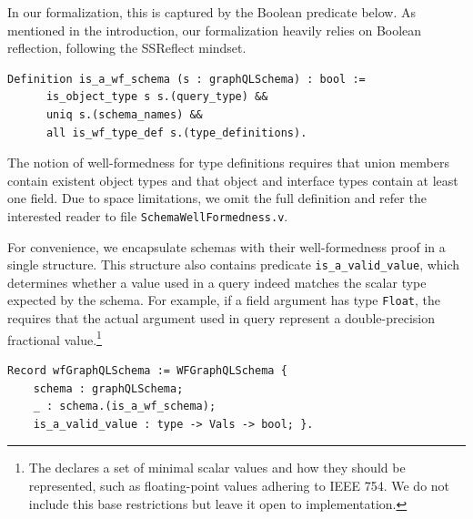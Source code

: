 In our \coq formalization, this is captured by the Boolean predicate below. As mentioned in the introduction, our formalization heavily relies on Boolean reflection, following the SSReflect mindset.
%
\begin{verbatim}
Definition is_a_wf_schema (s : graphQLSchema) : bool :=
      is_object_type s s.(query_type) &&
      uniq s.(schema_names) &&
      all is_wf_type_def s.(type_definitions).
\end{verbatim}
%
The notion of well-formedness for type definitions requires \eg that union members contain existent object types and that object and interface types contain at least one field. Due to space limitations, we omit the full definition and refer the interested reader to file \texttt{SchemaWellFormedness.v}.




For convenience, we encapsulate schemas with their well-formedness proof in a single structure. This structure also contains predicate \texttt{is_a_valid_value}, which determines whether a value used in a query indeed matches the scalar type expected by the schema. For example, if a field argument has type \texttt{Float}, the \spec requires that the actual argument used in query represent a double-precision fractional value.\footnote{The \spec declares a set of minimal scalar values and how they should be represented, such as floating-point values adhering to IEEE 754. We do not include this base restrictions but leave it open to implementation.}
%
\begin{verbatim}
Record wfGraphQLSchema := WFGraphQLSchema {
    schema : graphQLSchema;
    _ : schema.(is_a_wf_schema);
    is_a_valid_value : type -> Vals -> bool; }.
\end{verbatim}

